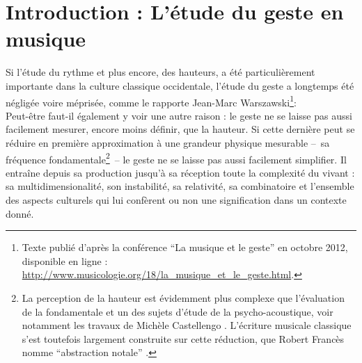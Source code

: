 \clearpage

\section{Introduction : L'étude du geste en musique}

\noindent Si l'étude du rythme et plus encore, des hauteurs, a été particulièrement importante dans la culture classique occidentale, l'étude du geste a longtemps été négligée voire méprisée, comme le rapporte Jean-Marc Warszawski\footnote{Texte publié d'après la conférence ``La musique et le geste'' en octobre 2012, disponible en ligne : \url{http://www.musicologie.org/18/la_musique_et_le_geste.html}.}: \\
\indent Peut-être faut-il également y voir une autre raison : le geste ne se laisse pas aussi facilement mesurer, encore moins définir, que la hauteur. Si cette dernière peut se  réduire en première approximation à une grandeur physique mesurable --~sa fréquence fondamentale\footnote{La perception de la hauteur est évidemment plus complexe que l'évaluation de la fondamentale et un des sujets d'étude de la psycho-acoustique, voir notamment les travaux de Michèle Castellengo \cite{castellengo_ecoute_2015}. L'écriture musicale classique s'est toutefois largement construite sur cette réduction, que Robert Francès nomme ``abstraction notale'' \cite{frances_perception_1984}.}~-- le geste ne se laisse pas aussi facilement simplifier. Il entraîne depuis sa production jusqu'à sa réception toute la complexité du vivant : sa multidimensionalité, son instabilité, sa relativité, sa combinatoire et l'ensemble des aspects culturels qui lui confèrent ou non une signification dans un contexte donné.\\

